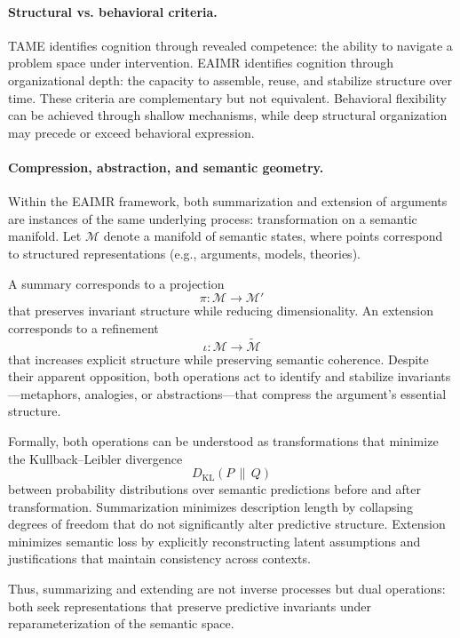\documentclass[11pt,letterpaper]{article}
\begin{document}
\paragraph{Structural vs. behavioral criteria.}
TAME identifies cognition through revealed competence: the ability to navigate 
a problem space under intervention. EAIMR identifies cognition through 
organizational depth: the capacity to assemble, reuse, and stabilize structure 
over time. These criteria are complementary but not equivalent. Behavioral 
flexibility can be achieved through shallow mechanisms, while deep structural 
organization may precede or exceed behavioral expression.

\paragraph{Compression, abstraction, and semantic geometry.}
Within the EAIMR framework, both summarization and extension of arguments are 
instances of the same underlying process: transformation on a semantic 
manifold. Let $\mathcal{M}$ denote a manifold of semantic states, where points 
correspond to structured representations (e.g., arguments, models, theories).

A summary corresponds to a projection
\[
\pi: \mathcal{M} \rightarrow \mathcal{M}'
\]
that preserves invariant structure while reducing dimensionality. An extension 
corresponds to a refinement
\[
\iota: \mathcal{M} \rightarrow \widetilde{\mathcal{M}}
\]
that increases explicit structure while preserving semantic coherence. Despite 
their apparent opposition, both operations act to identify and stabilize 
invariants—metaphors, analogies, or abstractions—that compress the argument’s 
essential structure.

Formally, both operations can be understood as transformations that minimize 
the Kullback--Leibler divergence
\[
D_{\mathrm{KL}}(P \,\|\, Q)
\]
between probability distributions over semantic predictions before and after 
transformation. Summarization minimizes description length by collapsing 
degrees of freedom that do not significantly alter predictive structure. 
Extension minimizes semantic loss by explicitly reconstructing latent 
assumptions and justifications that maintain consistency across contexts.

Thus, summarizing and extending are not inverse processes but dual operations: 
both seek representations that preserve predictive invariants under 
reparameterization of the semantic space.
\end{document}
